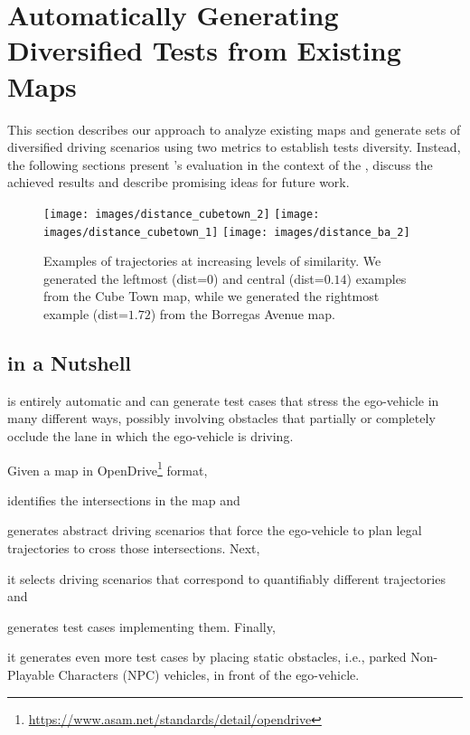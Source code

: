 \documentclass[conference]{IEEEtran}
\begin{document}
\section{Automatically Generating Diversified Tests from Existing Maps}
This section describes our approach to analyze existing maps and generate sets of diversified driving scenarios using two metrics to establish tests diversity. Instead, the following sections present \tool's evaluation in the context of the \challenge, discuss the achieved results and describe promising ideas for future work.

\begin{figure}[t]
\texttt{[image: images/distance\_cubetown\_2]}
\endminipage\hfill
{}
\texttt{[image: images/distance\_cubetown\_1]}
\endminipage\hfill
{}%
  \texttt{[image: images/distance\_ba\_2]}
\endminipage
\caption{Examples of trajectories at increasing levels of similarity. We generated the leftmost (dist=$0$) and central (dist=$0.14$) examples from the Cube Town map, while we generated the rightmost example (dist=$1.72$) from the Borregas Avenue map.}
\label{fig:similarity}
\end{figure}


\subsection{\tool in a Nutshell}
\tool is entirely automatic and can generate test cases that stress the ego-vehicle in many different ways, possibly involving obstacles that partially or completely occlude the lane in which the ego-vehicle is driving. 

Given a map in OpenDrive\footnote{\href{https://www.asam.net/standards/detail/opendrive/}{https://www.asam.net/standards/detail/opendrive}}  format, \tool 
\begin{inparaenum}[(1)]
\item identifies the intersections in the map and 
\item generates abstract driving scenarios that force the ego-vehicle to plan legal trajectories to cross those intersections. Next, \item it selects driving scenarios that correspond to quantifiably different trajectories and
\item generates test cases implementing them. 
Finally, \item it generates even more test cases by placing static obstacles, i.e., parked Non-Playable Characters (NPC) vehicles, in front of the ego-vehicle.
\end{inparaenum}
\end{document}
